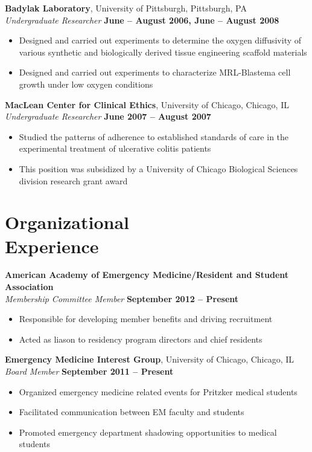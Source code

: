 \documentclass[margin,line]{resume}
\begin{document}
\begin{resume}
    \textbf{Badylak Laboratory}, University of Pittsburgh, Pittsburgh, PA \\\vspace{1mm}%
    \textsl{Undergraduate Researcher} \hfill \textbf{June -- August 2006, June -- August 2008}
    \begin{itemize}
    \item Designed and carried out experiments to determine the oxygen diffusivity of various synthetic and 
    biologically derived tissue engineering scaffold materials
    \item Designed and carried out experiments to characterize MRL-Blastema cell growth under low oxygen conditions
    \end{itemize}

    \textbf{MacLean Center for Clinical Ethics}, University of Chicago, Chicago, IL \\\vspace{1mm}%
    \textsl{Undergraduate Researcher} \hfill \textbf{June 2007 -- August 2007}
    \begin{itemize}
    \item Studied the patterns of adherence to established standards of care in the experimental treatment of ulcerative colitis patients
    \item This position was subsidized by a University of Chicago Biological Sciences division research grant award
    \end{itemize}

    \section{\mysidestyle Organizational\\Experience}
    \textbf{American Academy of Emergency Medicine/Resident and Student Association}\\\vspace{1mm}%
    \textsl{Membership Committee Member} \hfill \textbf{September 2012 -- Present}\vspace{1mm}%
    \begin{itemize}
    \item Responsible for developing member benefits and driving recruitment
    \item Acted as liason to residency program directors and chief residents
    \end{itemize}

    \textbf{Emergency Medicine Interest Group}, University of Chicago, Chicago, IL \\\vspace{1mm}%
    \textsl{Board Member} \hfill \textbf{September 2011 -- Present}\vspace{1mm}%
    \begin{itemize}
    \item Organized emergency medicine related events for Pritzker medical students
    \item Facilitated communication between EM faculty and students
    \item Promoted emergency department shadowing opportunities to medical students
    \end{itemize}


\end{resume}
\end{document}
